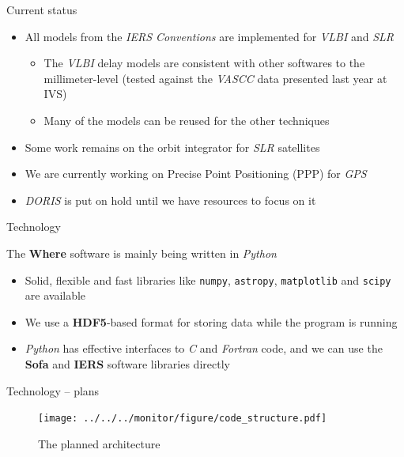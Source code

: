 \documentclass[ignorenonframetext,12pt,t]{beamer}
\begin{document}
\begin{frame}{Current status}

\begin{itemize}
\item
  All models from the \emph{IERS Conventions} are implemented for
  \emph{VLBI} and \emph{SLR}

  \begin{itemize}
  \item
    The \emph{VLBI} delay models are consistent with other softwares to
    the millimeter-level (tested against the \emph{VASCC} data presented
    last year at IVS)
  \item
    Many of the models can be reused for the other techniques
  \end{itemize}
\item
  Some work remains on the orbit integrator for \emph{SLR} satellites
\item
  We are currently working on Precise Point Positioning (PPP) for
  \emph{GPS}
\item
  \emph{DORIS} is put on hold until we have resources to focus on it
\end{itemize}

\end{frame}

\begin{frame}[fragile]{Technology}

The \textbf{Where} software is mainly being written in \emph{Python}

\begin{itemize}
\item
  Solid, flexible and fast libraries like \texttt{numpy},
  \texttt{astropy}, \texttt{matplotlib} and \texttt{scipy} are available
\item
  We use a \textbf{HDF5}-based format for storing data while the program
  is running
\item
  \emph{Python} has effective interfaces to \emph{C} and \emph{Fortran}
  code, and we can use the \textbf{Sofa} and \textbf{IERS} software
  libraries directly
\end{itemize}

\end{frame}

\begin{frame}{Technology -- plans}

\begin{figure}
\centering
\texttt{[image: ../../../monitor/figure/code\_structure.pdf]}
\caption{The planned architecture}
\end{figure}

\end{frame}
\end{document}
